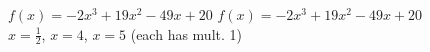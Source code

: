 {$f(x) = -2x^{3} + 19x^{2} - 49x + 20$}
{$f(x) = -2x^{3} + 19x^{2} - 49x + 20$ \\ $x = \frac{1}{2}$, $x = 4$, $x = 5$ (each has mult. 1)}